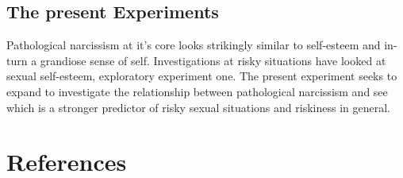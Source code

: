 \documentclass[
  donotrepeattitle,doc, 12pt, a4paper,floatsintext]{apa7}
\begin{document}
\hypertarget{the-present-experiments}{%
\subsection{The present Experiments}\label{the-present-experiments}}

Pathological narcissism at it's core looks strikingly similar to self-esteem and in-turn a grandiose sense of self. Investigations at risky situations have looked at sexual self-esteem, exploratory experiment one. The present experiment seeks to expand to investigate the relationship between pathological narcissism and see which is a stronger predictor of risky sexual situations and riskiness in general.

\newpage

\hypertarget{references}{%
\section{References}\label{references}}

\begingroup
\setlength{\parindent}{-0.5in}
\setlength{\leftskip}{0.5in}
\end{document}

